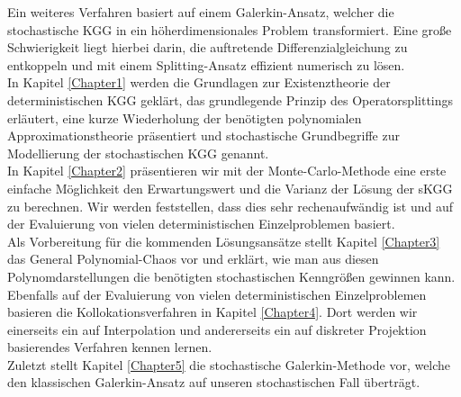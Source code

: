 Ein weiteres Verfahren basiert auf einem Galerkin-Ansatz, welcher die stochastische KGG in ein höherdimensionales Problem transformiert. Eine große Schwierigkeit liegt hierbei darin, die auftretende Differenzialgleichung zu entkoppeln und mit einem Splitting-Ansatz effizient numerisch zu lösen.\\[0.2cm]
In Kapitel \ref{Chapter1} werden die Grundlagen zur Existenztheorie der deterministischen KGG geklärt, das grundlegende Prinzip des Operatorsplittings erläutert, eine kurze Wiederholung der benötigten polynomialen Approximationstheorie präsentiert und stochastische Grundbegriffe zur Modellierung der stochastischen KGG genannt.\\
In Kapitel \ref{Chapter2} präsentieren wir mit der Monte-Carlo-Methode eine erste einfache Möglichkeit den Erwartungswert und die Varianz der Lösung der sKGG zu berechnen. Wir werden feststellen, dass dies sehr rechenaufwändig ist und auf der Evaluierung von vielen deterministischen Einzelproblemen basiert.\\
Als Vorbereitung für die kommenden Lösungsansätze stellt Kapitel \ref{Chapter3} das General Polynomial-Chaos vor und erklärt, wie man aus diesen Polynomdarstellungen die benötigten stochastischen Kenngrößen gewinnen kann.\\
Ebenfalls auf der Evaluierung von vielen deterministischen Einzelproblemen basieren die Kollokationsverfahren in Kapitel \ref{Chapter4}. Dort werden wir einerseits ein auf Interpolation und andererseits ein auf diskreter Projektion basierendes Verfahren kennen lernen.\\
Zuletzt stellt Kapitel \ref{Chapter5} die stochastische Galerkin-Methode vor, welche den klassischen Galerkin-Ansatz auf unseren stochastischen Fall überträgt.